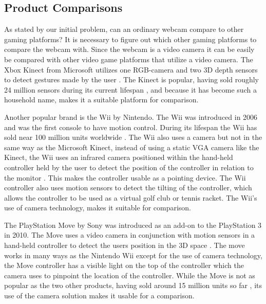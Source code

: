 \subsection{Product Comparisons}
As stated by our initial problem, can an ordinary webcam compare to other gaming platforms? It is necessary to figure out which other gaming platforms to compare the webcam with. Since the webcam is a video camera it can be easily be compared with other video game platforms that utilize a video camera. The Xbox Kinect from Microsoft utilizes one RGB-camera and two 3D depth sensors to detect gestures made by the user \parencite{Cong}. The Kinect is popular, having sold roughly 24 million sensors during its current lifespan \parencite{MSByNumbers}, and because it has become such a household name, makes it a suitable platform for comparison.
\bigskip

Another popular brand is the Wii by Nintendo. The Wii was introduced in 2006 and was the first console to have motion control. During its lifespan the Wii has sold near 100 million units worldwide \parencite{NintendoSales}. The Wii also uses a camera but not in the same way as the Microsoft Kinect, instead of using a static VGA camera like the Kinect, the Wii uses an infrared camera positioned within the hand-held controller held by the user to detect the position of the controller in relation to the monitor \parencite{Castaneda2006}. This makes the controller usable as a pointing device. The Wii controller also uses motion sensors to detect the tilting of the controller, which allows the controller to be used as a virtual golf club or tennis racket. The Wii's use of camera technology, makes it suitable for comparison.
\bigskip

The PlayStation Move by Sony was introduced as an add-on to the PlayStation 3 in 2010. The Move uses a video camera in conjunction with motion sensors in a hand-held controller to detect the users position in the 3D space \parencite{Kumar2009}. The move works in many ways as the Nintendo Wii except for the use of camera technology, the Move controller has a visible light on the top of the controller which the camera uses to pinpoint the location of the controller. While the Move is not as popular as the two other products, having sold around 15 million units so far \parencite{Yin-Poole2012}, its use of the camera solution makes it usable for a comparison.
